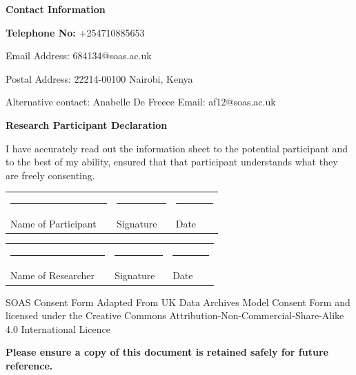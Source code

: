 \textbf{Contact Information}

\textbf{Telephone No:} +254710885653

Email Address: 684134@soas.ac.uk

Postal Address: 22214-00100 Nairobi, Kenya

Alternative contact: Anabelle De Freece Email: af12@soas.ac.uk

\textbf{Research Participant Declaration}

I have accurately read out the information sheet to the potential participant and to the best of my ability, ensured that that participant understands what they are freely consenting.

\vspace{1.5em}
\begin{tabular}{p{0.45\linewidth} p{0.25\linewidth} p{0.2\linewidth}}
\rule{\linewidth}{0.4pt} & \rule{\linewidth}{0.4pt} & \rule{\linewidth}{0.4pt} \\
Name of Participant & Signature & Date \\
\end{tabular}

\vspace{1.5em}
\begin{tabular}{p{0.45\linewidth} p{0.25\linewidth} p{0.2\linewidth}}
\rule{\linewidth}{0.4pt} & \rule{\linewidth}{0.4pt} & \rule{\linewidth}{0.4pt} \\
Name of Researcher & Signature & Date \\
\end{tabular}

SOAS Consent Form Adapted From UK Data Archives Model Consent Form and licensed under the Creative Commons Attribution-Non-Commercial-Share-Alike 4.0 International Licence

\textbf{Please ensure a copy of this document is retained safely for future reference.}